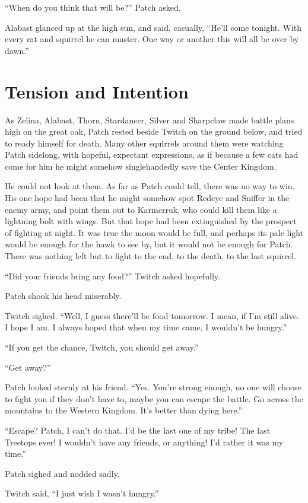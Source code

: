 \documentclass[ebook,oneside,openany,17pt]{memoir}
\newenvironment{tolerant}[1]{%
  \par\tolerance=#1\relax
}{%
  \par
}
\renewcommand{\thechapter}{\Roman{chapter}}
\newcounter{sections}
\newcommand{\sections}[1]{%
  \section*{#1}
  \addtocounter{sections}{1}%
  \pdfbookmark[1]{#1}{section.\thechapter.\thesections}}
\begin{document}
“When do you think that will be?” Patch asked.

Alabast glanced up at the high sun, and said, casually, “He’ll come
tonight. With every rat and squirrel he can muster. One way or another
this will all be over by dawn.”


\sections{Tension and Intention}

\begin{tolerant}{1000}
As Zelina, Alabast, Thorn, Stardancer, Silver and Sharpclaw made
battle plans high on the great oak, Patch rested beside Twitch on the
ground below, and tried to ready himself for death. Many other
squirrels around them were watching Patch sidelong, with hopeful,
expectant expressions, as if because a few cats had come for him he
might somehow singlehandedly save the Center Kingdom.
\end{tolerant}

He could not look at them. As far as Patch could tell, there was no
way to win. His one hope had been that he might somehow spot Redeye
and Sniffer in the enemy army, and point them out to Karmerruk, who
could kill them like a lightning bolt with wings. But that hope had
been extinguished by the prospect of fighting at night. It was true
the moon would be full, and perhaps its pale light would be enough for
the hawk to see by, but it would not be enough for Patch. There was
nothing left but to fight to the end, to the death, to the last
squirrel.

“Did your friends bring any food?” Twitch asked hopefully.

Patch shook his head miserably.

Twitch sighed. “Well, I guess there’ll be food tomorrow. I mean, if
I’m still alive. I hope I am. I always hoped that when my time came, I
wouldn’t be hungry.”

“If you get the chance, Twitch, you should get away.”

“Get away?”

Patch looked sternly at his friend. “Yes. You’re strong enough, no one
will choose to fight you if they don’t have to, maybe you can escape
the battle. Go across the mountains to the Western Kingdom. It’s
better than dying here.”

“Escape? Patch, I can’t do that. I’d be the last one of my tribe! The
last Treetops ever! I wouldn’t have any friends, or anything! I’d
rather it was my time.”

Patch sighed and nodded sadly.

Twitch said, “I just wish I wasn’t hungry.”
\end{document}
